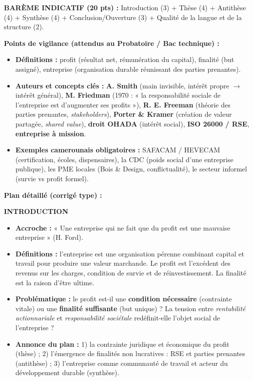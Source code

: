 \documentclass[11pt]{article}
\begin{document}
\begin{corrige}
\textbf{BARÈME INDICATIF (20 pts) :} Introduction (3) + Thèse (4) + Antithèse (4) + Synthèse (4) + Conclusion/Ouverture (3) + Qualité de la langue et de la structure (2).

\textbf{Points de vigilance (attendus au Probatoire / Bac technique) :}
\begin{itemize}
    \item \textbf{Définitions :} profit (résultat net, rémunération du capital), finalité (but assigné), entreprise (organisation durable réunissant des parties prenantes).
    \item \textbf{Auteurs et concepts clés :} \textbf{A. Smith} (main invisible, intérêt propre $\rightarrow$ intérêt général), \textbf{M. Friedman} (1970 : « la responsabilité sociale de l'entreprise est d'augmenter ses profits »), \textbf{R. E. Freeman} (théorie des parties prenantes, \emph{stakeholders}), \textbf{Porter \& Kramer} (création de valeur partagée, \emph{shared value}), \textbf{droit OHADA} (intérêt social), \textbf{ISO 26000 / RSE}, \textbf{entreprise à mission}.
    \item \textbf{Exemples camerounais obligatoires :} SAFACAM / HEVECAM (certification, écoles, dispensaires), la CDC (poids social d'une entreprise publique), les PME locales (Bois \& Design, conflictualité), le secteur informel (survie vs profit formel).
\end{itemize}

\textbf{Plan détaillé (corrigé type) :}

\textbf{INTRODUCTION}
\begin{itemize}
    \item \textbf{Accroche :} « Une entreprise qui ne fait que du profit est une mauvaise entreprise » (H. Ford).
    \item \textbf{Définitions :} l'entreprise est une organisation pérenne combinant capital et travail pour produire une valeur marchande. Le profit est l'excédent des revenus sur les charges, condition de survie et de réinvestissement. La finalité est la raison d'être ultime.
    \item \textbf{Problématique :} le profit est-il une \textbf{condition nécessaire} (contrainte vitale) ou une \textbf{finalité suffisante} (but unique) ? La tension entre \emph{rentabilité actionnariale} et \emph{responsabilité sociétale} redéfinit-elle l'objet social de l'entreprise ?
    \item \textbf{Annonce du plan :} 1) la contrainte juridique et économique du profit (thèse) ; 2) l'émergence de finalités non lucratives : RSE et parties prenantes (antithèse) ; 3) l'entreprise comme communauté de travail et acteur du développement durable (synthèse).
\end{itemize}


\end{corrige}
\end{document}
